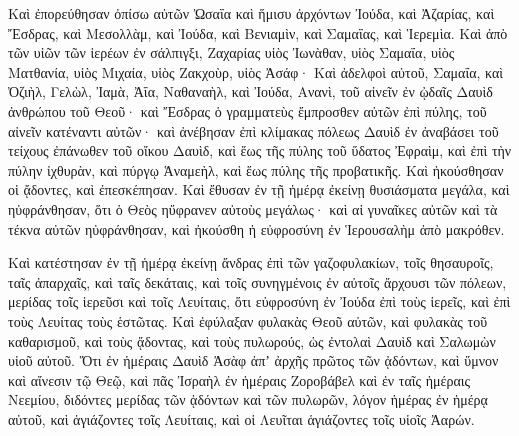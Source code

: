 {Καὶ ἐπορεύθησαν ὀπίσω αὐτῶν Ὠσαΐα καὶ ἥμισυ ἀρχόντων Ἰούδα,
καὶ Ἀζαρίας, καὶ Ἔσδρας, καὶ Μεσολλὰμ,
καὶ Ἰούδα, καὶ Βενιαμὶν, καὶ Σαμαΐας, καὶ Ἱερεμὶα.
Καὶ ἀπὸ τῶν υἱῶν τῶν ἱερέων ἐν σάλπιγξι, Ζαχαρίας υἱὸς Ἰωνὰθαν, υἱὸς Σαμαΐα, υἱὸς Ματθανία, υἱὸς Μιχαία, υἱὸς Ζακχοὺρ, υἱὸς Ἀσάφ·
Καὶ ἀδελφοὶ αὐτοῦ, Σαμαΐα, καὶ Ὀζιὴλ, Γελὼλ, Ἰαμὰ, Ἀΐα, Ναθαναὴλ, καὶ Ἰούδα, Ανανὶ, τοῦ αἰνεῖν ἐν ᾠδαῖς Δαυὶδ ἀνθρώπου τοῦ Θεοῦ· καὶ Ἔσδρας ὁ γραμματεὺς ἔμπροσθεν αὐτῶν ἐπὶ πύλης,
τοῦ αἰνεῖν κατέναντι αὐτῶν· καὶ ἀνέβησαν ἐπὶ κλίμακας πόλεως Δαυὶδ ἐν ἀναβάσει τοῦ τείχους ἐπάνωθεν τοῦ οἴκου Δαυὶδ, καὶ ἕως τῆς πύλης τοῦ ὕδατος
Ἐφραὶμ, καὶ ἐπὶ τὴν πύλην ἰχθυρὰν, καὶ πύργῳ Ἁναμεὴλ, καὶ ἕως πύλης τῆς προβατικῆς.
Καὶ ἠκούσθησαν οἱ ᾄδοντες, καὶ ἐπεσκέπησαν.
Καὶ ἔθυσαν ἐν τῇ ἡμέρᾳ ἐκείνῃ θυσιάσματα μεγάλα, καὶ ηὐφράνθησαν, ὅτι ὁ Θεὸς ηὔφρανεν αὐτοὺς μεγάλως· καὶ αἱ γυναῖκες αὐτῶν καὶ τὰ τέκνα αὐτῶν ηὐφράνθησαν, καὶ ἠκούσθη ἡ εὐφροσύνη ἐν Ἱερουσαλὴμ ἀπὸ μακρόθεν.
\par }{\PP {}Καὶ κατέστησαν ἐν τῇ ἡμέρᾳ ἐκείνῃ ἄνδρας ἐπὶ τῶν γαζοφυλακίων, τοῖς θησαυροῖς, ταῖς ἀπαρχαῖς, καὶ ταῖς δεκάταις, καὶ τοῖς συνηγμένοις ἐν αὐτοῖς ἄρχουσι τῶν πόλεων, μερίδας τοῖς ἱερεῦσι καὶ τοῖς Λευίταις, ὅτι εὐφροσύνη ἐν Ἰούδα ἐπὶ τοὺς ἱερεῖς, καὶ ἐπὶ τοὺς Λευίτας τοὺς ἑστῶτας.
Καὶ ἐφύλαξαν φυλακὰς Θεοῦ αὐτῶν, καὶ φυλακὰς τοῦ καθαρισμοῦ, καὶ τοὺς ᾄδοντας, καὶ τοὺς πυλωρούς, ὡς ἐντολαὶ Δαυὶδ καὶ Σαλωμὼν υἱοῦ αὐτοῦ.
Ὅτι ἐν ἡμέραις Δαυὶδ Ἀσὰφ ἀπʼ ἀρχῆς πρῶτος τῶν ᾀδόντων, καὶ ὕμνον καὶ αἴνεσιν τῷ Θεῷ,
καὶ πᾶς Ἰσραὴλ ἐν ἡμέραις Ζοροβάβελ καὶ ἐν ταῖς ἡμέραις Νεεμίου, διδόντες μερίδας τῶν ᾀδόντων καὶ τῶν πυλωρῶν, λόγον ἡμέρας ἐν ἡμέρᾳ αὐτοῦ, καὶ ἁγιάζοντες τοῖς Λευίταις, καὶ οἱ Λευῖται ἁγιάζοντες τοῖς υἱοῖς Ἀαρών.

}
